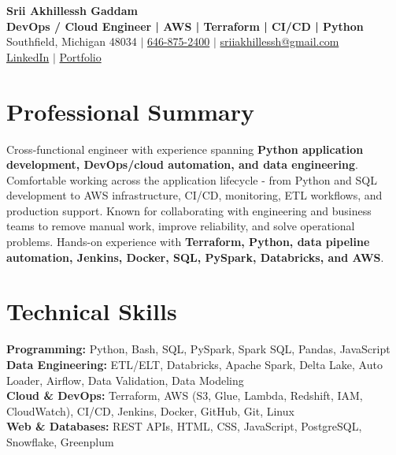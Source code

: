 \documentclass[letterpaper,10pt]{article}
\begin{document}
\fontsize{9.35pt}{10.45pt}\selectfont

\begin{center}
    {\LARGE \textbf{Srii Akhillessh Gaddam}} \\[-1pt]
    \textbf{DevOps / Cloud Engineer | AWS | Terraform | CI/CD | Python} \\[2pt]
    Southfield, Michigan 48034 $|$
    \href{tel:6468752400}{646-875-2400} $|$
    \href{mailto:sriiakhillessh@gmail.com}{sriiakhillessh@gmail.com} \\[1pt]
    \href{https://www.linkedin.com/in/srii-akhiilessh-gaddam-b48668191/}{LinkedIn} $|$
    \href{https://sriiakhillesshg.github.io/portfolio/}{Portfolio}
\end{center}
\vspace{-8pt}

\section{Professional Summary}
\small{Cross-functional engineer with experience spanning \textbf{Python application development, DevOps/cloud automation, and data engineering}. Comfortable working across the application lifecycle - from Python and SQL development to AWS infrastructure, CI/CD, monitoring, ETL workflows, and production support. Known for collaborating with engineering and business teams to remove manual work, improve reliability, and solve operational problems. Hands-on experience with \textbf{Terraform, Python, data pipeline automation, Jenkins, Docker, SQL, PySpark, Databricks, and AWS}.}

\section{Technical Skills}
\small{
\textbf{Programming:} Python, Bash, SQL, PySpark, Spark SQL, Pandas, JavaScript \\
\textbf{Data Engineering:} ETL/ELT, Databricks, Apache Spark, Delta Lake, Auto Loader, Airflow, Data Validation, Data Modeling \\
\textbf{Cloud \& DevOps:} Terraform, AWS (S3, Glue, Lambda, Redshift, IAM, CloudWatch), CI/CD, Jenkins, Docker, GitHub, Git, Linux \\
\textbf{Web \& Databases:} REST APIs, HTML, CSS, JavaScript, PostgreSQL, Snowflake, Greenplum
}
\end{document}
